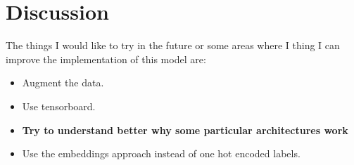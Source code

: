 \documentclass[11pt, a4paper]{article}
\begin{document}
\section{Discussion}%
\label{sec:discussion}


The things I would like to try in the future or some areas where I thing I can improve the implementation of this model are:


\begin{itemize}
	\item Augment the data. 
	\item Use tensorboard.
	\item \textbf{Try to understand better why some particular architectures work}
	\item Use the embeddings approach instead of one hot encoded labels. 
\end{itemize}
\end{document}
